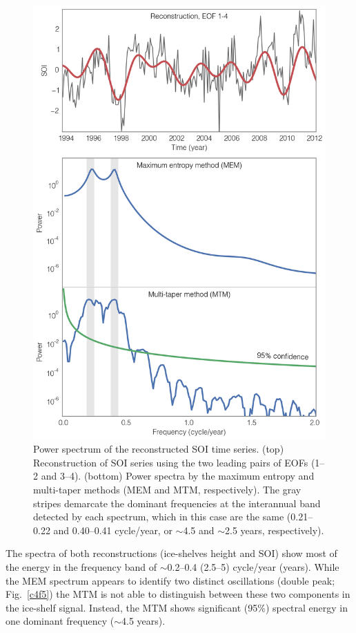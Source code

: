 \begin{figure}[!ht]
  \centering
  \includegraphics[width=.72\textwidth]{img/mem_mtm_soi_v2.png}
  \caption[Power spectrum of the SOI reconstruction]{
  Power spectrum of the reconstructed SOI time series. (top) Reconstruction of SOI series using the two leading pairs of EOFs (1--2 and 3--4). (bottom) Power spectra by the maximum entropy and multi-taper methods (MEM and MTM, respectively). The gray stripes demarcate the dominant frequencies at the interannual band detected by each spectrum, which in this case are the same (0.21--0.22 and 0.40--0.41 cycle/year, or $\sim$4.5 and $\sim$2.5 years, respectively).
  }
  \label{c4f8}
\end{figure}


The spectra of both reconstructions (ice-shelves height and SOI) show most of the energy in the frequency band of $\sim$0.2--0.4 (2.5--5) cycle/year (years). While the MEM spectrum appears to identify two distinct oscillations (double peak; Fig.~\ref{c4f5}) the MTM is not able to distinguish between these two components in the ice-shelf signal. Instead, the MTM shows significant (95\%) spectral energy in one dominant frequency ($\sim$4.5 years).


